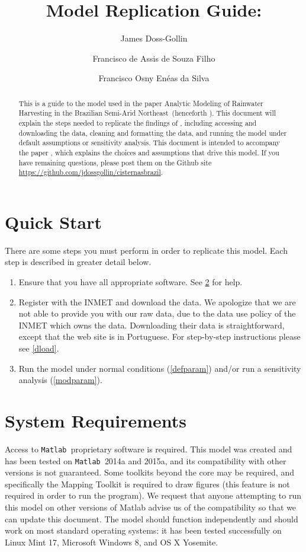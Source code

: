 \documentclass[11pt]{article} %
\title{Model Replication Guide: \\ \thepaper}
\author{James Doss-Gollin \and Francisco de Assis de Souza Filho \and Francisco Osny En\'{e}as da Silva}
\newcommand{\mtlb}{\texttt{Matlab\ }}
\newcommand{\thepaper}{Analytic Modeling of Rainwater Harvesting in the Brazilian Semi-Arid Northeast}
\newcommand{\github}{\url{https://github.com/jdossgollin/cisternasbrazil}}
\begin{document}
\maketitle %

\begin{abstract} %
This is a guide to the model used in the paper \thepaper \ (henceforth \cite{dossgollin2015}).
This document will explain the steps needed to replicate the findings of \cite{dossgollin2015}, including accessing and downloading the data, cleaning and formatting the data, and running the model under default assumptions or sensitivity analysis.
This document is intended to accompany the paper \cite{dossgollin2015} , which explains the choices and assumptions that drive this model.
If you have remaining questions, please post them on the Github site \github.
\end{abstract}

\clearpage
\tableofcontents
\clearpage %


\section{Quick Start}

There are some steps you must perform in order to replicate this model.
Each step is described in greater detail below.
\begin{enumerate}
\item Ensure that you have all appropriate software. See \cref{requirements} for help.
\item Register with the \ac{INMET} and download the data. We apologize that we are not able to provide you with our raw data, due to the data use policy of the \ac{INMET} which owns the data. Downloading their data is straightforward, except that the web site is in Portuguese. For step-by-step instructions please see \cref{dload}.
\item Run the model under normal conditions (\cref{defparam}) and/or run a sensitivity analysis (\cref{modparam}).
\end{enumerate}



\section{System Requirements} \label{requirements}

Access to \mtlb proprietary software is required.
This model was created and has been tested on \mtlb 2014a and 2015a, and its compatibility with other versions is not guaranteed.
Some toolkits beyond the core may be required, and specifically the Mapping Toolkit is required to draw figures (this feature is not required in order to run the program).
We request that anyone attempting to run this model on other versions of Matlab advise us of the compatibility so that we can update this document.
The model should function independently and should work on most standard operating systems: it has been tested successfully on Linux Mint 17, Microsoft Windows 8, and OS X Yosemite.
\end{document}

